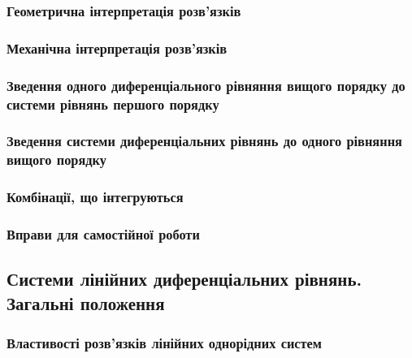 \documentclass[a4paper, 12pt]{article}
\theoremstyle{definition}
\numberwithin{equation}{section}%
\numberwithin{equation}{subsection}
\begin{document}


\subsubsection{Геометрична інтерпретація розв'язків}



\subsubsection{Механічна інтерпретація розв'язків}



\subsubsection{Зведення одного диференціального рівняння вищого порядку до системи рівнянь першого порядку}



\subsubsection{Зведення системи диференціальних рівнянь до одного рівняння вищого порядку}



\subsubsection{Комбінації, що інтегруються}



\subsubsection{Вправи для самостійної роботи}



\subsection{Системи лінійних диференціальних рівнянь. Загальні положення}



\subsubsection{Властивості розв'язків лінійних однорідних систем}
\end{document}
